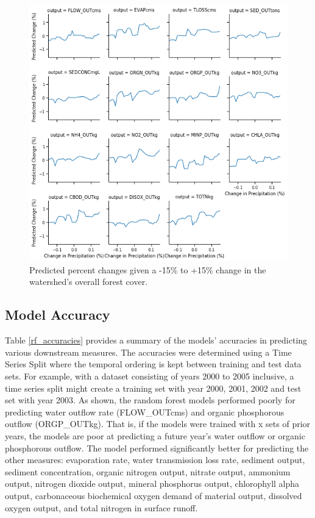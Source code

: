 \documentclass[runningheads]{llncs}
\begin{document}
\begin{figure}[h]
\begin{center}
%
  \includegraphics[width=\linewidth]{images/predictions_precipitation_facetgrid.png}
\endminipage
\caption{Predicted percent changes given a -15\% to +15\% change in the watershed's overall forest cover.} \label{fig-pcp}
\end{center}
\end{figure}

\subsection{Model Accuracy}
Table \ref{rf_accuracies} provides a summary of the models' accuracies in predicting various downstream measures.
The accuracies were determined using a Time Series Split where the temporal ordering is kept between training and test data sets.
For example, with a dataset consisting of years 2000 to 2005 inclusive, a time series split might create a training set with year 2000, 2001, 2002 and test set with year 2003.
As shown, the random forest models performed poorly for predicting water outflow rate (FLOW\_OUTcms) and organic phosphorous outflow (ORGP\_OUTkg).
That is, if the models were trained with x sets of prior years, the models are poor at predicting a future year's water outflow or organic phosphorous outflow.
The model performed significantly better for predicting the other measures: evaporation rate, water transmission loss rate, sediment output, sediment concentration, organic nitrogen output, nitrate output, ammonium output, nitrogen dioxide output, mineral phosphorus output, chlorophyll alpha output, carbonaceous biochemical oxygen demand of material output, dissolved oxygen output, and total nitrogen in surface runoff.
\end{document}
